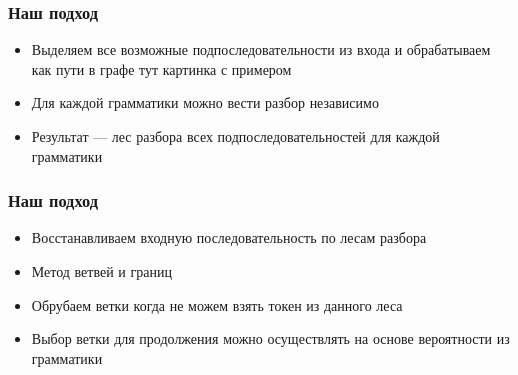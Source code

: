 \documentclass{beamer}
\begin{document}
 \begin{frame}
     \frametitle{Наш подход}
     \begin{itemize}
         \item Выделяем все возможные подпоследовательности из входа и обрабатываем как пути в графе
         			тут картинка с примером
         \item Для каждой грамматики можно вести разбор независимо
         \item Результат --- лес разбора всех подпоследовательностей для каждой грамматики
     \end{itemize}
 \end{frame}
 
 \begin{frame}
	\frametitle{Наш подход}
	\begin{itemize}
		\item Восстанавливаем входную последовательность по лесам разбора
		\item Метод ветвей и границ
		\item Обрубаем ветки когда не можем взять токен из данного леса
		\item Выбор ветки для продолжения можно осуществлять на основе вероятности из грамматики
	\end{itemize}
\end{frame}
\end{document}
